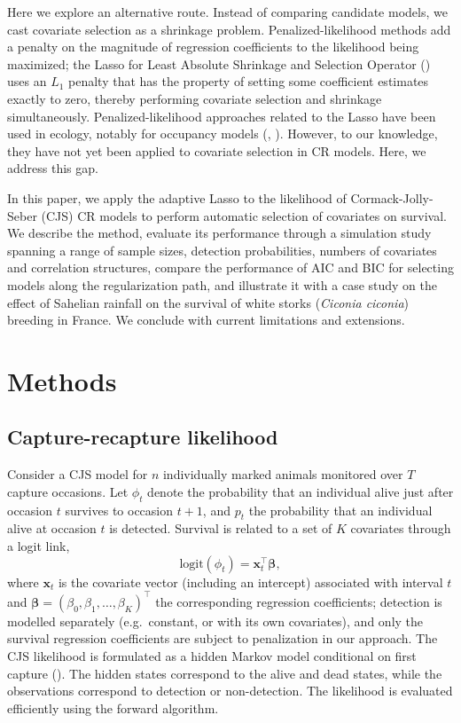 \documentclass[
  11pt,
  a4paper,
]{article}
\begin{document}
Here we explore an alternative route. Instead of comparing candidate models, we cast covariate selection as a shrinkage problem. Penalized-likelihood methods add a penalty on the magnitude of regression coefficients to the likelihood being maximized; the Lasso for Least Absolute Shrinkage and Selection Operator () uses an \(L_1\) penalty that has the property of setting some coefficient estimates exactly to zero, thereby performing covariate selection and shrinkage simultaneously. Penalized-likelihood approaches related to the Lasso have been used in ecology, notably for occupancy models (, ). However, to our knowledge, they have not yet been applied to covariate selection in CR models. Here, we address this gap.

In this paper, we apply the adaptive Lasso to the likelihood of Cormack-Jolly-Seber (CJS) CR models to perform automatic selection of covariates on survival. We describe the method, evaluate its performance through a simulation study spanning a range of sample sizes, detection probabilities, numbers of covariates and correlation structures, compare the performance of AIC and BIC for selecting models along the regularization path, and illustrate it with a case study on the effect of Sahelian rainfall on the survival of white storks (\emph{Ciconia ciconia}) breeding in France. We conclude with current limitations and extensions.

\section{Methods}\label{methods}

\subsection{Capture-recapture likelihood}\label{capture-recapture-likelihood}

Consider a CJS model for \(n\) individually marked animals monitored over \(T\) capture occasions. Let \(\phi_t\) denote the probability that an individual alive just after occasion \(t\) survives to occasion \(t+1\), and \(p_t\) the probability that an individual alive at occasion \(t\) is detected. Survival is related to a set of \(K\) covariates through a logit link,
\[
\text{logit}(\phi_t) = \mathbf{x}_t^\top \boldsymbol{\beta},
\]
where \(\mathbf{x}_t\) is the covariate vector (including an intercept) associated with interval \(t\) and \(\boldsymbol{\beta} = (\beta_0, \beta_1, \ldots, \beta_K)^\top\) the corresponding regression coefficients; detection is modelled separately (e.g.~constant, or with its own covariates), and only the survival regression coefficients are subject to penalization in our approach. The CJS likelihood is formulated as a hidden Markov model conditional on first capture (). The hidden states correspond to the alive and dead states, while the observations correspond to detection or non-detection. The likelihood is evaluated efficiently using the forward algorithm.
\end{document}
